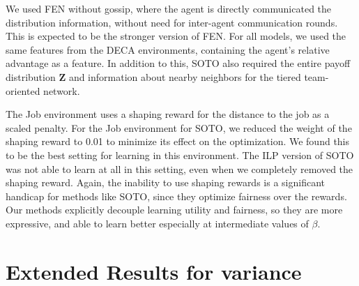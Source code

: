 We used FEN without gossip, where the agent is directly communicated the distribution information, without need for inter-agent communication rounds. This is expected to be the stronger version of FEN. 
For all models, we used the same features from the DECA environments, containing the agent's relative advantage as a feature. In addition to this, SOTO also required the entire payoff distribution $\textbf{Z}$ and information about nearby neighbors for the tiered team-oriented network.  

The Job environment uses a shaping reward for the distance to the job as a scaled penalty. For the Job environment for SOTO, we reduced the weight of the shaping reward to 0.01 to minimize its effect on the optimization. We found this to be the best setting for learning in this environment. The ILP version of SOTO was not able to learn at all in this setting, even when we completely removed the shaping reward. Again, the inability to use shaping rewards is a significant handicap for methods like SOTO, since they optimize fairness over the rewards. Our methods explicitly decouple learning utility and fairness, so they are more expressive, and able to learn better especially at intermediate values of $\beta$.


\section{Extended Results for variance}

